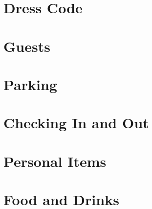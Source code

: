 \documentclass[pdflatex,letterpaper,twoside,12pt]{book}
\begin{document}
\section{Dress Code}


\section{Guests}


\section{Parking}




\section{Checking In and Out}


\section{Personal Items}


\section{Food and Drinks}

\end{document}

